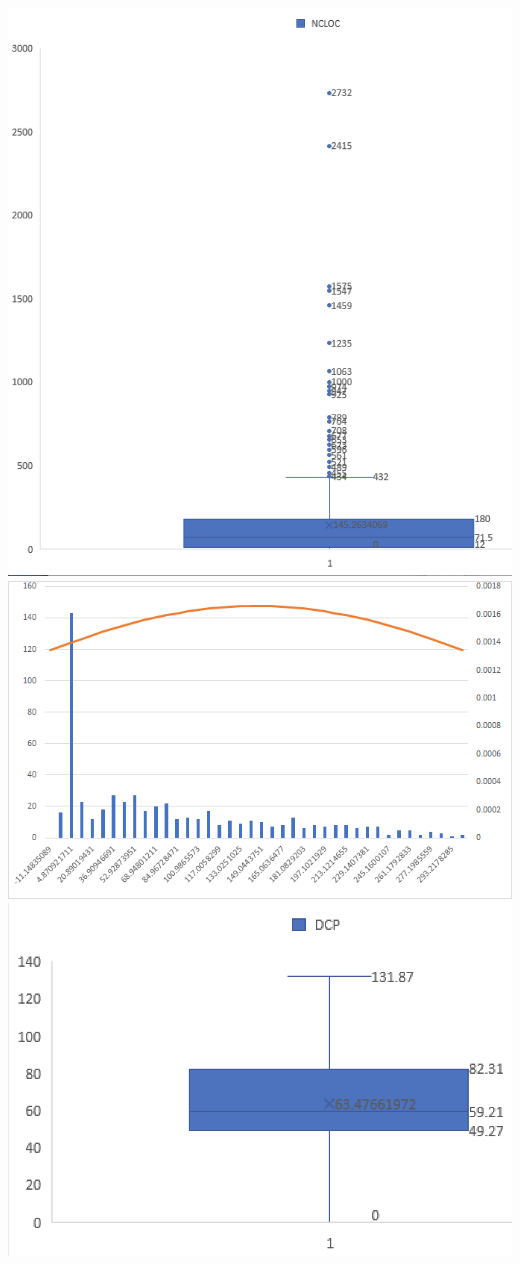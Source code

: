 \documentclass{article}
\begin{document}
\includegraphics[scale=0.5]{NCLOC.png}
\includegraphics[scale=0.35]{T1_3.png}\\
\includegraphics[scale=0.6]{DCP.png}
\end{document}
